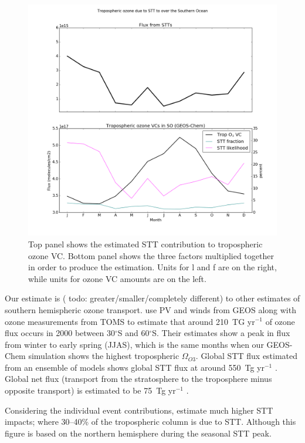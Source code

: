 \documentclass{article}
\begin{document}
  \begin{figure}[!htbp]
    \includegraphics[width=\textwidth]{figures/SO_extrapolation.png}
    \caption{Top panel shows the estimated STT contribution to tropospheric ozone VC. Bottom panel shows the three factors multiplied together in order to produce the estimation. Units for l and f are on the right, while units for ozone VC amounts are on the left.}
    \label{fig:SOExtrapolation}
  \end{figure}
  
  Our estimate is ( todo: greater/smaller/completely different) to other estimates of southern hemispheric ozone transport. 
  \citet{Olsen2003} use PV and winds from GEOS along with ozone measurements from TOMS to estimate that around 210~TG yr$^{-1}$ of ozone flux occurs in 2000 between 30$^{\circ}$S and 60$^{\circ}$S.
  Their estimates show a peak in flux from winter to early spring (JJAS), which is the same months when our GEOS-Chem simulation shows the highest tropospheric $\Omega_{O3}$.
  Global STT flux estimated from an ensemble of models shows global STT flux at around 550~Tg yr$^{-1}$ \citep{Stevenson2006}.
  Global net flux (transport from the stratosphere to the troposphere minus opposite transport) is estimated to be 75~Tg yr$^{-1}$ \citep{Sprenger2003}.
  
  Considering the individual event contributions, \citet{Terao2008} estimate much higher STT impacts; where 30--40\% of the tropospheric column is due to STT. 
  Although this figure is based on the northern hemisphere during the seasonal STT peak.
  
\end{document}
